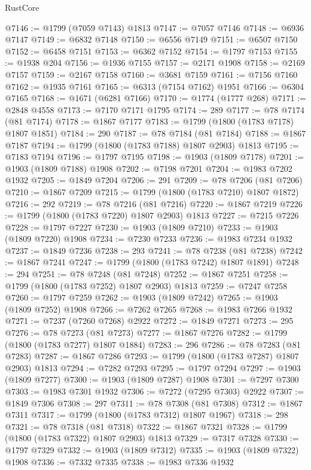 \begin{lexlean}{RustCore}
\begin{coremodule}
@7146 := @1799 (@7059 @7143) @1813
@7147 := @7057 @7146
@7148 := @6936 @7147
@7149 := @6832 @7148
@7150 := @6556 @7149
@7151 := @6507 @7150
@7152 := @6458 @7151
@7153 := @6362 @7152
@7154 := @1797 @7153
@7155 := @1938 @204
@7156 := @1936 @7155
@7157 := @2171 @1908
@7158 := @2169 @7157
@7159 := @2167 @7158
@7160 := @3681 @7159
@7161 := @7156 @7160
@7162 := @1935 @7161
@7165 := @6313 (@7154 @7162) @1951
@7166 := @6304 @7165
@7168 := @1671 (@6281 @7166)
@7170 := @1774 (@1777 @268)
@7171 := @2848 @4558
@7173 := @7170 @7171 @1795
@7174 := 289
@7177 := @78 @7174 (@81 @7174)
@7178 := @1867 @7177
@7183 := @1799 (@1800 (@1783 @7178) @1807 @1851)
@7184 := 290
@7187 := @78 @7184 (@81 @7184)
@7188 := @1867 @7187
@7194 := @1799 (@1800 (@1783 @7188) @1807 @2903) @1813
@7195 := @7183 @7194
@7196 := @1797 @7195
@7198 := @1903 (@1809 @7178)
@7201 := @1903 (@1809 @7188) @1908
@7202 := @7198 @7201
@7204 := @1983 @7202 @1932
@7205 := @1849 @7204
@7206 := 291
@7209 := @78 @7206 (@81 @7206)
@7210 := @1867 @7209
@7215 := @1799 (@1800 (@1783 @7210) @1807 @1872)
@7216 := 292
@7219 := @78 @7216 (@81 @7216)
@7220 := @1867 @7219
@7226 := @1799 (@1800 (@1783 @7220) @1807 @2903) @1813
@7227 := @7215 @7226
@7228 := @1797 @7227
@7230 := @1903 (@1809 @7210)
@7233 := @1903 (@1809 @7220) @1908
@7234 := @7230 @7233
@7236 := @1983 @7234 @1932
@7237 := @1849 @7236
@7238 := 293
@7241 := @78 @7238 (@81 @7238)
@7242 := @1867 @7241
@7247 := @1799 (@1800 (@1783 @7242) @1807 @1891)
@7248 := 294
@7251 := @78 @7248 (@81 @7248)
@7252 := @1867 @7251
@7258 := @1799 (@1800 (@1783 @7252) @1807 @2903) @1813
@7259 := @7247 @7258
@7260 := @1797 @7259
@7262 := @1903 (@1809 @7242)
@7265 := @1903 (@1809 @7252) @1908
@7266 := @7262 @7265
@7268 := @1983 @7266 @1932
@7271 := @7237 (@7260 @7268) @2922
@7272 := @1849 @7271
@7273 := 295
@7276 := @78 @7273 (@81 @7273)
@7277 := @1867 @7276
@7282 := @1799 (@1800 (@1783 @7277) @1807 @1884)
@7283 := 296
@7286 := @78 @7283 (@81 @7283)
@7287 := @1867 @7286
@7293 := @1799 (@1800 (@1783 @7287) @1807 @2903) @1813
@7294 := @7282 @7293
@7295 := @1797 @7294
@7297 := @1903 (@1809 @7277)
@7300 := @1903 (@1809 @7287) @1908
@7301 := @7297 @7300
@7303 := @1983 @7301 @1932
@7306 := @7272 (@7295 @7303) @2922
@7307 := @1849 @7306
@7308 := 297
@7311 := @78 @7308 (@81 @7308)
@7312 := @1867 @7311
@7317 := @1799 (@1800 (@1783 @7312) @1807 @1967)
@7318 := 298
@7321 := @78 @7318 (@81 @7318)
@7322 := @1867 @7321
@7328 := @1799 (@1800 (@1783 @7322) @1807 @2903) @1813
@7329 := @7317 @7328
@7330 := @1797 @7329
@7332 := @1903 (@1809 @7312)
@7335 := @1903 (@1809 @7322) @1908
@7336 := @7332 @7335
@7338 := @1983 @7336 @1932

\end{coremodule}
\end{lexlean}
